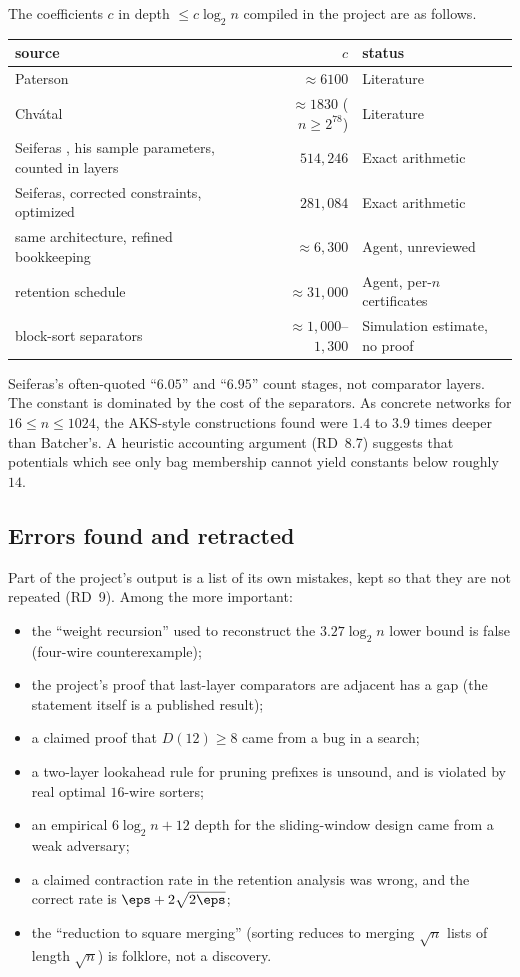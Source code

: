 The coefficients $c$ in depth $\le c \log_2 n$ compiled in the project are as follows.
\begin{center}
\begin{tabular}{lrl}
\toprule
source & $c$ & status \\
\midrule
Paterson \cite{paterson1990improved} & $\approx 6100$ & Literature \\
Chv\'atal \cite{chvatal1992lecture} & $\approx 1830$ ($n \ge 2^{78}$) & Literature \\
Seiferas \cite{seiferas2009sorting}, his sample parameters, counted in layers & $514{,}246$ & Exact arithmetic \\
Seiferas, corrected constraints, optimized & $281{,}084$ & Exact arithmetic \\
same architecture, refined bookkeeping & $\approx 6{,}300$ & Agent, unreviewed \\
retention schedule & $\approx 31{,}000$ & Agent, per-$n$ certificates \\
block-sort separators & $\approx 1{,}000$--$1{,}300$ & Simulation estimate, no proof \\
\bottomrule
\end{tabular}
\end{center}
Seiferas's often-quoted ``$6.05$'' and ``$6.95$'' count stages, not comparator layers. The constant is dominated by the cost of the separators. As concrete networks for $16 \le n \le 1024$, the AKS-style constructions found were $1.4$ to $3.9$ times deeper than Batcher's. A heuristic accounting argument (RD~8.7) suggests that potentials which see only bag membership cannot yield constants below roughly $14$.

\subsection{Errors found and retracted}\label{sec:retractions}

Part of the project's output is a list of its own mistakes, kept so that they are not repeated (RD~9). Among the more important:
\begin{itemize}
    \item the ``weight recursion'' used to reconstruct the $3.27\log_2 n$ lower bound is false (four-wire counterexample);
    \item the project's proof that last-layer comparators are adjacent has a gap (the statement itself is a published result);
    \item a claimed proof that $D(12) \ge 8$ came from a bug in a search;
    \item a two-layer lookahead rule for pruning prefixes is unsound, and is violated by real optimal $16$-wire sorters;
    \item an empirical $6\log_2 n + 12$ depth for the sliding-window design came from a weak adversary;
    \item a claimed contraction rate in the retention analysis was wrong, and the correct rate is $\eps + 2\sqrt{2\eps}$;
    \item the ``reduction to square merging'' (sorting reduces to merging $\sqrt n$ lists of length $\sqrt n$) is folklore, not a discovery.
\end{itemize}


